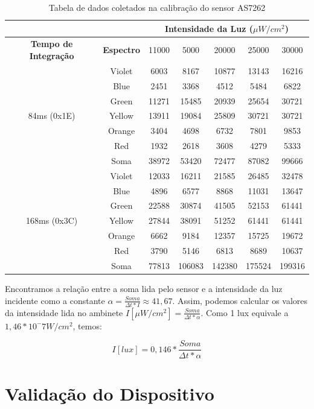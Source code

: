 \documentclass[../monografia.tex]{subfiles}
\begin{document}
\begin{table}[h]
\centering
\begin{tabular}{ |c|c|c|c|c|c|c| }
	\hline
	\multicolumn{2}{|c|}{} & \multicolumn{5}{|c|}{\textbf{Intensidade da Luz} ($\mu W/cm^2$)} \\
	\hline
	\textbf{Tempo de Integração} & \textbf{Espectro} & 11000	& 5000 & 20000 & 25000 & 30000 \\
	\hline
	\hline
	\multirow{7}{3em}{84ms (0x1E)} & Violet & 6003&8167&10877&13143 & 16216 \\
	& Blue	&2451	&3368	&4512	&5484	&6822 \\
	& Green	&11271	&15485	&20939	&25654	&30721 \\
	& Yellow &13911	&19084	&25809	&30721	&30721 \\
	& Orange &3404	&4698	&6732	&7801	&9853 \\
	& Red	&1932	&2618	&3608	&4279	&5333 \\
	\hline
	& Soma	&38972	&53420	&72477	&87082	&99666 \\
	\hline
	\multirow{7}{3em}{168ms (0x3C)} & Violet & 12033&	16211&	21585&	26485&	32478\\
	&Blue	&4896	&6577	&8868	&11031	&13647 \\
	&Green	&22588	&30874	&41505	&52153	&61441 \\
	&Yellow	&27844	&38091	&51252	&61441	&61441 \\
	&Orange	&6662	&9184	&12357	&15725	&19672 \\
	&Red	&3790	&5146	&6813	&8689	&10637 \\
	\hline
	&Soma	&77813	&106083	&142380	&175524	&199316 \\
	\hline
\end{tabular}
\caption{Tabela de dados coletados na calibração do sensor AS7262}
\label{table:tabela-luz}
\end{table}
\hfill \break

Encontramos a relação entre a soma lida pelo sensor e a intensidade da luz incidente como a constante $\alpha = \frac{Soma}{\Delta t * I} \approx 41,67$. Assim, podemos calcular os valores da intensidade lida no ambinete $I[\mu W/cm^2]=\frac{Soma}{\Delta t * \alpha}$. Como 1 lux equivale a $1,46*10^-7 W/cm^2$, temos: 

\[I[lux]= 0,146*\frac{Soma}{\Delta t * \alpha}\] \newpage

\section{Validação do Dispositivo} %
\end{document}
